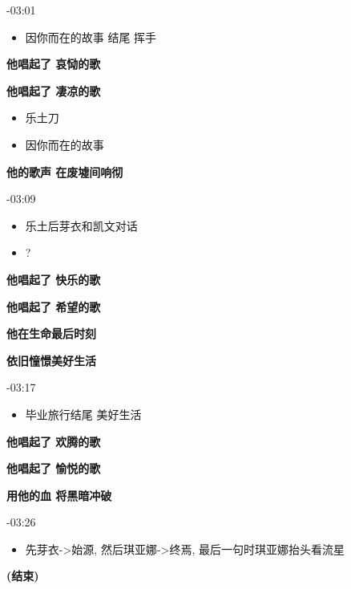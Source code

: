\documentclass[a4paper]{article}
\begin{document}
-03:01

\begin{itemize}
    \item 因你而在的故事 结尾 挥手
\end{itemize}

\textbf{他唱起了 哀恸的歌}

\textbf{他唱起了 凄凉的歌}

\begin{itemize}
    \item 乐土刀
    \item 因你而在的故事
\end{itemize}

\textbf{他的歌声 在废墟间响彻}

-03:09

\begin{itemize}
    \item 乐土后芽衣和凯文对话
    \item ?
\end{itemize}

\textbf{他唱起了 快乐的歌}

\textbf{他唱起了 希望的歌}

\textbf{他在生命最后时刻}

\textbf{依旧憧憬美好生活}

-03:17

\begin{itemize}
    \item 毕业旅行结尾 美好生活
\end{itemize}

\textbf{他唱起了 欢腾的歌}

\textbf{他唱起了 愉悦的歌}

\textbf{用他的血 将黑暗冲破}

-03:26

\begin{itemize}
    \item 先芽衣->始源, 然后琪亚娜->终焉, 最后一句时琪亚娜抬头看流星
\end{itemize}

\textbf{(结束)}
\end{document}
